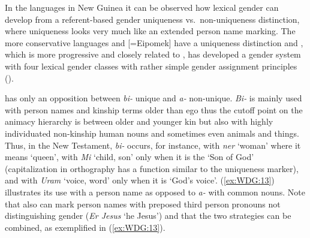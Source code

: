 \documentclass[output=collectionpaper]{langsci/langscibook}
\begin{document}
In the  languages in New Guinea it can be observed how lexical gender can develop from a referent-based gender uniqueness vs.\ non-uniqueness distinction, where uniqueness looks very much like an extended person name marking. The more conservative  languages  and  [=Eipomek] have a uniqueness distinction and , which is more progressive and closely related to , has developed a gender system with four lexical gender classes with rather simple gender assignment principles (\citealt{Waelchli2018}).

 has only an opposition between \textit{bi-} unique and \textit{a-} non-unique. \textit{Bi-} is mainly used with person names and kinship terms older than ego \textendash{} thus the cutoff point on the animacy hierarchy is between older and younger kin \textendash{} but also with highly individuated non-kinship human nouns and sometimes even animals and things. Thus, in the  New Testament, \textit{bi-} occurs, for instance, with \textit{ner} `woman' where it means `queen', with \textit{Mi} `child, son' only when it is the `Son of God' (capitalization in orthography has a function similar to the uniqueness marker), and with \textit{Uram} `voice, word' only when it is `God's voice'. (\ref{ex:WDG:13}) illustrates its use with a person name as opposed to \textit{a-} with common nouns. Note that  also can mark person names with preposed third person pronouns not distinguishing gender (\textit{Er Jesus} `he Jesus') and that the two strategies can be combined, as exemplified in (\ref{ex:WDG:13}).

%
\end{document}
